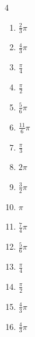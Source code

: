 \begin{multicols}{4}
\begin{enumerate}
  \item $\displaystyle \frac{2}{3}\pi$

  \item $\displaystyle \frac{4}{3}\pi$

  \item $\displaystyle \frac{\pi}{4}$

  \item $\displaystyle \frac{\pi}{2}$

  \item $\displaystyle \frac{5}{6}\pi$

  \item $\displaystyle \frac{11}{6}\pi$

  \item $\displaystyle \frac{\pi}{3}$

  \item $\displaystyle 2\pi$

  \item $\displaystyle \frac{3}{2}\pi$

  \item $\displaystyle \pi$

  \item $\displaystyle \frac{7}{4}\pi$

  \item $\displaystyle \frac{5}{6}\pi$

  \item $\displaystyle \frac{\pi}{4}$

  \item $\displaystyle \frac{\pi}{2}$

  \item $\displaystyle \frac{4}{3}\pi$

  \item $\displaystyle \frac{4}{3}\pi$


\end{enumerate}
\end{multicols}
